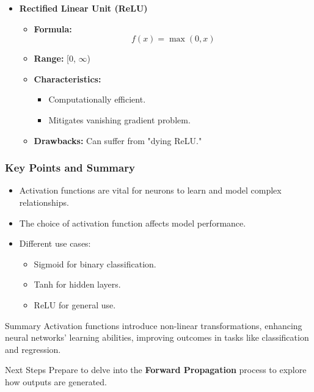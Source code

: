 \documentclass[aspectratio=169]{beamer}
\begin{document}
\begin{frame}[fragile]
\begin{itemize}
        \item \textbf{Rectified Linear Unit (ReLU)}
        \begin{itemize}
            \item \textbf{Formula:} $$ f(x) = \max(0, x) $$
            \item \textbf{Range:} [0, $\infty$)
            \item \textbf{Characteristics:}
            \begin{itemize}
                \item Computationally efficient.
                \item Mitigates vanishing gradient problem.
            \end{itemize}
            \item \textbf{Drawbacks:} Can suffer from "dying ReLU."
        \end{itemize}
    \end{itemize}
\end{frame}

\begin{frame}[fragile]
    \frametitle{Key Points and Summary}
    \begin{itemize}
        \item Activation functions are vital for neurons to learn and model complex relationships.
        \item The choice of activation function affects model performance.
        \item Different use cases: 
        \begin{itemize}
            \item Sigmoid for binary classification.
            \item Tanh for hidden layers.
            \item ReLU for general use.
        \end{itemize}
    \end{itemize}
    
    \begin{block}{Summary}
        Activation functions introduce non-linear transformations, enhancing neural networks' learning abilities, improving outcomes in tasks like classification and regression.
    \end{block}

    \begin{block}{Next Steps}
        Prepare to delve into the \textbf{Forward Propagation} process to explore how outputs are generated.
    \end{block}
\end{frame}
\end{document}
